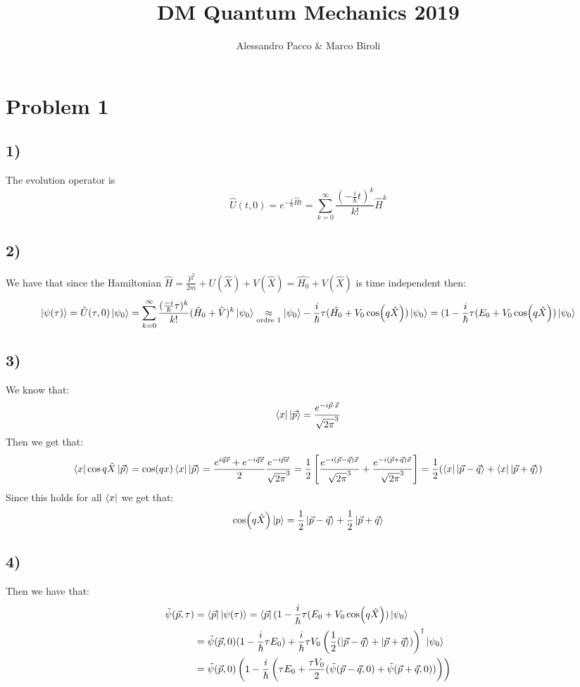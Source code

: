 \documentclass[10pt,a4paper]{book}
\author{Alessandro Pacco \& Marco Biroli}
\title{DM Quantum Mechanics 2019}
\begin{document}
 
\maketitle

\section*{Problem 1}


\subsection*{1)}

The evolution operator is 
$$\hat{U}(t,0)=e^{-\frac{i}{\hbar}\hat{H}t}=\sum_{k=0}^{\infty} \frac{(-\frac{i}{\hbar}t)^k}{k!}\hat{H}^k$$


\subsection*{2)}

We have that since the Hamiltonian $\hat{H}=\frac{\hat{P}^2}{2m}+U(\hat{X})+V(\hat{X})=\hat{H_0}+V(\hat{X})$ is time independent then:
$$\ket{\psi(\tau)}=\hat{U}(\tau,0)\ket{\psi_0}=\sum_{k=0}^{\infty}\frac{(\frac{-i}{\hbar}\tau)^k}{k!}(\hat{H}_0+\hat{V})^k\ket{\psi_0}\underset{\text{ordre }1}{\approx} \ket{\psi_0}-\frac{i}{\hbar}\tau(\hat{H_0}+V_0\cos(q\hat{X}))\ket{\psi_0}=(1-\frac{i}{\hbar}\tau( E_0+V_0\cos(q\hat{X}))\ket{\psi_0}$$

\subsection*{3)}
We know that:
\[
\bra{x} \ket{\vec{p}} = \frac{e^{-i \vec{p} \cdot \vec{x}}}{\sqrt{2 \pi}^3} 
\]
Then we get that:
\[
\bra{x} \cos q \hat{X} \ket{\vec{p}} = \cos(qx) \bra{x}\ket{\vec{p}} = \frac{e^{i \vec{q} \vec{x}} + e^{-i \vec{q} \vec{x}}}{2} \frac{e^{-i \vec{p} \vec{x}}}{\sqrt{2 \pi}^3} = \frac{1}{2} \left[  \frac{e^{-i (\vec{p} - \vec{q}) \vec{x}}}{\sqrt{2 \pi}^3} + \frac{e^{-i(\vec{p} + \vec{q}) \vec{x}}}{\sqrt{2 \pi}^3} \right] = \frac{1}{2} (\bra{x}\ket{\vec{p} - \vec{q}} + \bra{x} \ket{\vec{p} + \vec{q}})
\]
Since this holds for all $\bra{x}$  we get that:
\[
\cos (q \hat{X}) \ket{p} = \frac{1}{2} \ket{\vec{p} - \vec{q}} + \frac{1}{2} \ket{\vec{p} + \vec{q}}
\]

\subsection*{4)}
Then we have that:
\begin{align*}
\tilde{\psi}(\vec{p}, \tau) &= \bra{\vec{p}}\ket{\psi(\tau)} = \bra{\vec{p}}(1 - \frac{i}{\hbar} \tau (E_0 + V_0 \cos(q \hat{X})) \ket{\psi_0} \\
&= \tilde{\psi}(\vec{p}, 0) (1 - \frac{i}{\hbar}\tau E_0) + \frac{i}{\hbar} \tau V_0 \left( \frac{1}{2}(\ket{\vec{p} - \vec{q}} + \ket{\vec{p} + \vec{q}}) \right)^\dagger \ket{\psi_0} \\
&= \tilde{\psi}(\vec{p}, 0) \left(1 - \frac{i}{\hbar}\left( \tau E_0 + \frac{\tau V_0}{2} (\tilde{\psi}(\vec{p} - \vec{q}, 0) + \tilde{\psi}(\vec{p} + \vec{q}, 0)) \right) \right) 
\end{align*}
\end{document}
